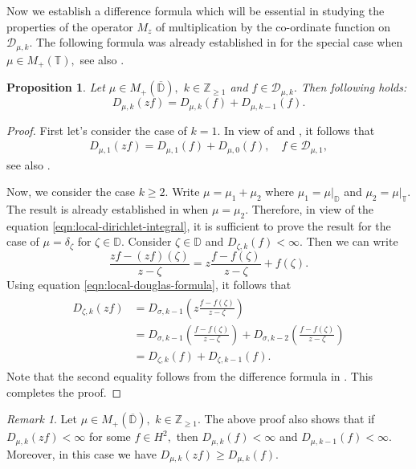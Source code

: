 \documentclass[10pt,oneside,reqno]{amsart}
\newtheorem{proposition}[theorem]{Proposition}
\theoremstyle{definition}
\theoremstyle{remark}
\newtheorem{remark}[theorem]{Remark}
\renewcommand{\ge}{\geqslant}
\newcommand{\D}{\mathbb D}
\newcommand{\T}{\mathbb T}
\numberwithin{equation}{section}
\begin{document}
Now we establish a difference formula which will be essential in studying the properties of the operator $M_z$ of multiplication by the co-ordinate function on $ \mathscr D_{\mu, k}.$ The following formula was already established in \cite[Proposition 2.7]{GGR22} for the special case when $\mu\in  M_+(\T),$ see also \cite[Proposition 3.4]{Rydhe19}.
\begin{proposition}\label{prop:diff-formula}
    Let $\mu\in M_+(\overline{\D}),$ $k\in \mathbb Z_{\geqslant 1}$ and  $f\in \mathscr D_{\mu, k}.$ Then following holds:
    \begin{equation*}
        D_{\mu, k} (zf) = D_{\mu, k} (f) + D_{\mu, k-1} (f).
    \end{equation*}
\end{proposition}

\begin{proof}
      First let's consider the case of $k=1.$ In view of \cite[Theorem 4.1]{Richter91} and  \cite[Ch. IV, Proposition 1.6]{1993multiplication}, it follows that 
\begin{align*}
   D_{\mu,1}(zf)= D_{\mu,1}(f) +  D_{\mu,0}(f),\quad f\in\mathscr{D}_{\mu, 1},
\end{align*}
see also \cite[Ch. IV, Theorem 1.10]{1993multiplication}. 

Now, we consider the case $k \ge 2$. Write $\mu=\mu_1+\mu_2$ where $\mu_1 = \mu |_{\D}$ and $\mu_2 = \mu |_{\T}$. The result is already established in \cite[Proposition 2.7]{GGR22} when $\mu=\mu_2.$ Therefore, in view of the equation \eqref{eqn:local-dirichlet-integral}, it is sufficient to prove the result for the case of $\mu=\delta_{\zeta}$ for $\zeta\in\D.$  Consider $\zeta \in \D$ and  $D_{\zeta,k}(f) < \infty.$ Then we can write
\begin{equation*}
    \frac{zf - (zf) (\zeta)}{z-\zeta} = z \frac{f- f (\zeta)}{z-\zeta} + f(\zeta).
\end{equation*}
Using equation \eqref{eqn:local-douglas-formula}, it follows that
\begin{align*}
    \begin{split}
        D_{\zeta,k}(zf) &=  D_{\sigma, k-1} \left( z \frac{f-f\left( \zeta \right)}{z-\zeta} \right) \\
        &= D_{\sigma, k-1} \left( \frac{f-f\left( \zeta \right)}{z-\zeta} \right) + D_{\sigma, k-2} \left( \frac{f-f\left( \zeta \right)}{z-\zeta} \right) \\
        &= D_{\zeta,k}(f) + D_{\zeta,k-1}(f).
    \end{split}
    \end{align*}
    Note that the second equality follows from the difference formula in   \cite[Proposition 2.7]{GGR22}. This completes the proof.
\end{proof}
\begin{remark}\label{zf vs f}
Let $\mu\in M_+(\overline{\D}),$ $k\in \mathbb Z_{\geqslant 1}.$ The above proof also shows that if $D_{\mu,k}(zf) < \infty$ for some $f\in H^2,$ then $D_{\mu,k}(f) < \infty$ and $D_{\mu,k-1}(f) < \infty.$ Moreover, in this case we have $D_{\mu,k}(zf) \geqslant D_{\mu,k}(f).$ 
\end{remark}
\end{document}
